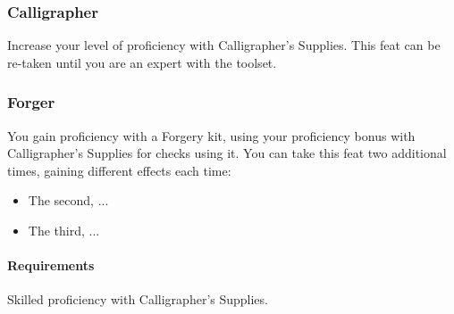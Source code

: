 \subsubsection{Calligrapher} \label{feat::calligrapher}
    Increase your level of proficiency with Calligrapher's Supplies.
    This feat can be re-taken until you are an expert with the toolset.
\subsubsection{Forger} \label{feat::forger}
    You gain proficiency with a Forgery kit, using your proficiency bonus with Calligrapher's Supplies for checks using it.
    You can take this feat two additional times, gaining different effects each time:
    \begin{itemize}
        \item The second, ...
        \item The third, ...
    \end{itemize}
    \paragraph{Requirements} Skilled proficiency with Calligrapher's Supplies.

